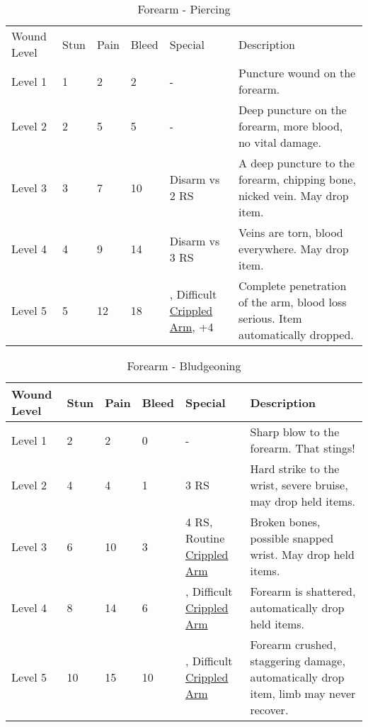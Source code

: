 \documentclass[oneside,11pt,english]{book}
\begin{document}
\begin{table}[!hb] %
	\caption{Forearm - Piercing}
	\label{wound:Forearm - Piercing}
	\begin{tabu} to 
Wound Level &Stun &Pain &Bleed &Special &Description\\
Level 1& 1& 2& 2& - &Puncture wound on the forearm.\\
Level 2& 2& 5& 5& - &Deep puncture on the forearm, more blood, no vital damage.\\
Level 3& 3& 7& 10& Disarm vs 2 RS &A deep puncture to the forearm, chipping bone, nicked vein. May drop item. \\
Level 4& 4& 9& 14& Disarm vs 3 RS &Veins are torn, blood everywhere. May drop item.\\
Level 5& 5& 12& 18& , \newline
Difficult  \hyperref[bane:Crippled Limb/Appendage]{Crippled Arm}, \newline
{} +4 &Complete penetration of the arm, blood loss serious. Item automatically dropped.\\
	\end{tabu}
\end{table}

\begin{table}[!hb] %
	\caption{Forearm - Bludgeoning}
	\label{wound:Forearm - Bludgeoning}
	\begin{tabu} to 
Wound Level &Stun &Pain &Bleed &Special &Description\\\toprule
Level 1& 2& 2& 0& - &Sharp blow to the forearm. That stings!\\
Level 2& 4& 4& 1&  3 RS &Hard strike to the wrist, severe bruise, may drop held items.\\
Level 3& 6& 10& 3
& 4 RS, \newline
Routine  \hyperref[bane:Crippled Limb/Appendage]{Crippled Arm} &Broken bones, possible snapped wrist. May drop held items.\\
Level 4& 8& 14& 6
	&, \newline
	Difficult  \hyperref[bane:Crippled Limb/Appendage]{Crippled Arm}
	&Forearm is shattered, automatically drop held items.\\
Level 5& 10& 15& 10
	&, \newline
		Difficult  \hyperref[bane:Crippled Limb/Appendage]{Crippled Arm}
		&Forearm crushed, staggering damage, automatically drop item, limb may never recover.\\
	\end{tabu}
\end{table}
\end{document}
